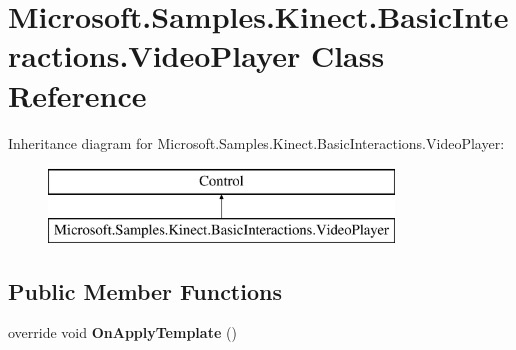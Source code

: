 \hypertarget{class_microsoft_1_1_samples_1_1_kinect_1_1_basic_interactions_1_1_video_player}{\section{Microsoft.\-Samples.\-Kinect.\-Basic\-Interactions.\-Video\-Player Class Reference}
\label{class_microsoft_1_1_samples_1_1_kinect_1_1_basic_interactions_1_1_video_player}
}
Inheritance diagram for Microsoft.\-Samples.\-Kinect.\-Basic\-Interactions.\-Video\-Player\-:\begin{figure}[H]
\begin{center}
\leavevmode
\includegraphics[height=2.000000cm]{class_microsoft_1_1_samples_1_1_kinect_1_1_basic_interactions_1_1_video_player}
\end{center}
\end{figure}
\subsection*{Public Member Functions}
\begin{DoxyCompactItemize}
\item 
\hypertarget{class_microsoft_1_1_samples_1_1_kinect_1_1_basic_interactions_1_1_video_player_a72f41ad2a89ff7c8e4801f5500499695}{override void {\bfseries On\-Apply\-Template} ()}\label{class_microsoft_1_1_samples_1_1_kinect_1_1_basic_interactions_1_1_video_player_a72f41ad2a89ff7c8e4801f5500499695}

\end{DoxyCompactItemize}
